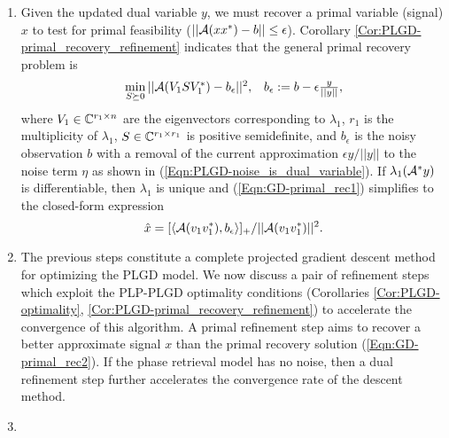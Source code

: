 \begin{enumerate}
\item

Given the updated dual variable $y$, we must recover a primal variable (signal) $x$ to test for primal feasibility ($|| {\mathcal A} (xx^*) - b || \leq \epsilon$).  Corollary \ref{Cor:PLGD-primal_recovery_refinement} indicates that the general primal recovery problem is
\begin{equation} 	\label{Eqn:GD-primal_rec1}
\begin{array}{lr}
\min\limits_{\substack{S \succeq 0}}	|| {\mathcal A}(V_1 S V_1^*) - b_\epsilon ||^2,
	& 	b_\epsilon := b - \epsilon \frac{y}{||y||},
\end{array}
\end{equation}
where $V_1 \in {\mathbb C}^{r_1 \times n}$ are the eigenvectors corresponding to $\lambda_1$, $r_1$ is the multiplicity of $\lambda_1$, $S \in {\mathbb C}^{r_1 \times r_1}$ is positive semidefinite, and $b_\epsilon$ is the noisy observation $b$ with a removal of the current approximation $\epsilon y / ||y||$ to the noise term $\eta$ as shown in (\ref{Eqn:PLGD-noise_is_dual_variable}).  If $ \lambda_1({\mathcal A}^* y)$ is differentiable, then $\lambda_1$ is unique and (\ref{Eqn:GD-primal_rec1}) simplifies to the closed-form expression
\begin{equation} 	\label{Eqn:GD-primal_rec2}
\hat{x} = [ \langle {\mathcal A}(v_1v_1^*), b_\epsilon \rangle ]_+ / || {\mathcal A}(v_1v_1^*)||^2.
\end{equation}




\item

The previous steps constitute a complete projected gradient descent method for optimizing the PLGD model.  We now discuss a pair of refinement steps which exploit the PLP-PLGD optimality conditions (Corollaries \ref{Cor:PLGD-optimality}, \ref{Cor:PLGD-primal_recovery_refinement}) to accelerate the convergence of this algorithm.  A primal refinement step aims to recover a better approximate signal $x$ than the primal recovery solution (\ref{Eqn:GD-primal_rec2}).  If the phase retrieval model has no noise, then a dual refinement step further accelerates the convergence rate of the descent method.  



\item


\end{enumerate}
